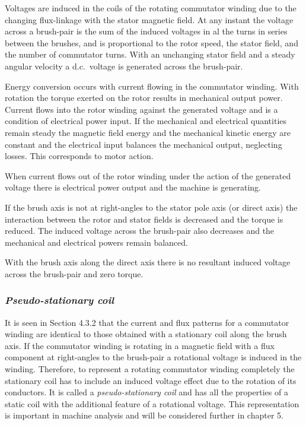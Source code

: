 \documentclass[a4paper,numbers=noenddot,12pt]{scrbook}
\begin{document}
            Voltages are induced in the coils of the rotating commutator winding due to the changing flux-linkage with the stator magnetic field. At any instant the voltage across a brush-pair is the sum of the induced voltages in al the turns in series between the brushes, and is proportional to the rotor speed, the stator field, and the number of commutator turns. With an unchanging stator field and a steady angular velocity a d.c.\ voltage is generated across the brush-pair.

            Energy conversion occurs with current flowing in the commutator winding. With rotation the torque exerted on the rotor results in mechanical output power. Current flows into the rotor winding against the generated voltage and is a condition of electrical power input. If the mechanical and electrical quantities remain steady the magnetic field energy and the mechanical kinetic energy are constant and the electrical input balances the mechanical output, neglecting losses. This corresponds to motor action.

            When current flows out of the rotor winding under the action of the generated voltage there is electrical power output and the machine is generating. 

            If the brush axis is not at right-angles to the stator pole axis (or direct axis) the interaction between the rotor and stator fields is decreased and the torque is reduced. The induced voltage across the brush-pair also decreases and the mechanical and electrical powers remain balanced.

            With the brush axis along the direct axis there is no resultant induced voltage across the brush-pair and zero torque.

            \subsubsection{\textit{Pseudo-stationary coil}}
            It is seen in Section 4.3.2 that the current and flux patterns for a commutator winding are identical to those obtained with a stationary coil along the brush axis. If the commutator winding is rotating in a magnetic field with a flux component at right-angles to the brush-pair a rotational voltage is induced in the winding. Therefore, to represent a rotating commutator winding completely the stationary coil has to include an induced voltage
            effect due to the rotation of its conductors. It is called a \textit{pseudo-stationary coil} and has all the properties of a static coil with the additional feature of a rotational voltage. This representation is important in machine analysis and will be considered further in chapter 5.
\end{document}
